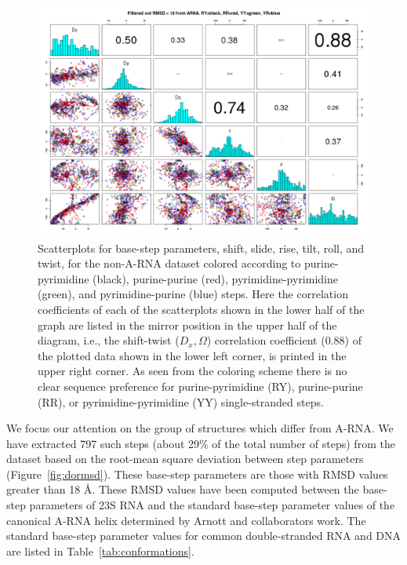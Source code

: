 \begin{figure}
 \centering
\includegraphics[angle=90, scale=0.5]{Chapter2/noarna_step.png}
\caption{Scatterplots  for base-step  parameters, shift,  slide, rise,
  tilt, roll,  and twist, for the non-A-RNA  dataset colored according
  to      purine-pyrimidine     (black),      purine-purine     (red),
  pyrimidine-pyrimidine   (green),    and   pyrimidine-purine   (blue)
  steps. Here the correlation coefficients of each of the scatterplots
  shown  in the  lower half  of  the graph  are listed  in the  mirror
  position in  the upper  half of the  diagram, i.e.,  the shift-twist
  ($D_{x}, \Omega$) correlation coefficient (0.88) of the plotted data
  shown  in the  lower  left corner,  is  printed in  the upper  right
  corner.  As  seen  from the  coloring  scheme there  is no  clear
  sequence preference for  purine-pyrimidine (RY), purine-purine (RR),
  or pyrimidine-pyrimidine (YY) single-stranded steps.  }
 \label{fig:pairsnoarna}
\end{figure}

We focus  our attention on the  group of structures  which differ from
A-RNA.  We have  extracted 797  such steps  (about 29\%  of  the total
number  of steps)  from  the  dataset based  on  the root-mean  square
deviation  between  step  parameters (Figure~\ref{fig:dormsd}).  These
base-step parameters are  those with RMSD values greater  than 18 \AA.
These RMSD values have  been computed between the base-step parameters
of  23S  RNA  and  the  standard base-step  parameter  values  of  the
canonical   A-RNA  helix  determined   by  Arnott   and  collaborators
\cite{arnott1973}  work. The standard  base-step parameter  values for
common    double-stranded    RNA     and    DNA    are    listed    in
Table~\ref{tab:conformations}.

